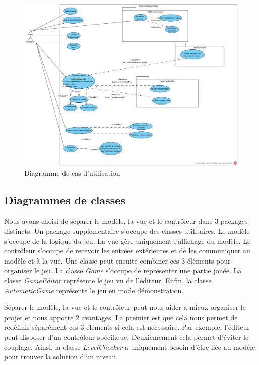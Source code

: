 \documentclass[]{article}
\begin{document}
\begin{figure}[H]
\begin{center}
  \includegraphics[width=\textwidth]{UseCase1.jpg}
  \caption{Diagramme de cas d'utilisation}\label{fig:auto}
\end{center}
\end{figure}

\subsection{Diagrammes de classes}

Nous avons choisi de séparer le modèle, la vue et le contrôleur dans 3 packages distincts. Un package supplémentaire s'occupe des classes utilitaires. Le modèle s'occupe de la logique du jeu. La vue gère uniquement l'affichage du modèle. Le contrôleur s'occupe de recevoir les entrées extérieures et de les communiquer au modèle et à la vue. Une classe peut ensuite combiner ces 3 éléments pour organiser le jeu. La classe \emph{Game} s'occupe de représenter une partie jouée. La classe \emph{GameEditor} représente le jeu vu de l'éditeur. Enfin, la classe \emph{AutomaticGame} représente le jeu en mode démonstration.

Séparer le modèle, la vue et le contrôleur peut nous aider à mieux organiser le projet et nous apporte 2 avantages. La premier est que cela nous permet de redéfinir séparément ces 3 éléments si cela est nécessaire. Par exemple, l'éditeur peut disposer d'un contrôleur spécifique. Deuxièmement cela permet d'éviter le couplage. Ainsi, la classe \emph{LevelChecker} a uniquement besoin d'être liée au modèle pour trouver la solution d'un niveau.
\end{document}
